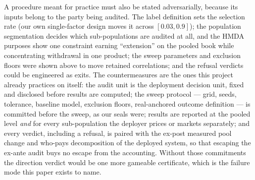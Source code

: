 \documentclass[conference]{IEEEtran}
\begin{document}
A procedure meant for practice must also be stated adversarially, because its inputs
belong to the party being audited. The label definition sets the selection rate (our own
single-factor design moves it across $[0.03, 0.9]$); the population segmentation decides
which sub-populations are audited at all, and the HMDA purposes show one constraint
earning ``extension'' on the pooled book while concentrating withdrawal in one product;
the sweep parameters and exclusion floors were shown above to move retained correlations;
and the refusal verdicts could be engineered as exits. The countermeasures are the ones
this project already practices on itself: the audit unit is the deployment decision unit,
fixed and disclosed before results are computed; the sweep protocol --- grid, seeds,
tolerance, baseline model, exclusion floors, real-anchored outcome definition --- is
committed before the sweep, as our seals were; results are reported at the pooled level
\emph{and} for every sub-population the deployer prices or markets separately; and every
verdict, including a refusal, is paired with the ex-post measured pool change and
who-pays decomposition of the deployed system, so that escaping the ex-ante audit buys no
escape from the accounting. Without those commitments the direction verdict would be one
more gameable certificate, which is the failure mode this paper exists to name.
\end{document}
